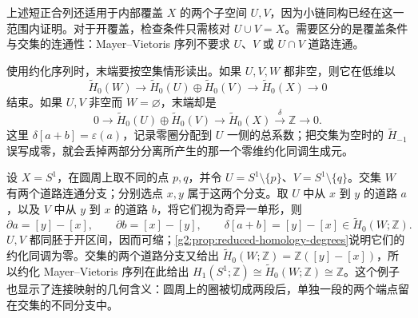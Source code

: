 上述短正合列还适用于内部覆盖 \(X\) 的两个子空间 \(U,V\)，因为小链同构已经在这一范围内证明。对于开覆盖，检查条件只需核对 \(U\cup V=X\)。需要区分的是覆盖条件与交集的连通性：Mayer--Vietoris 序列不要求 \(U\)、\(V\) 或 \(U\cap V\) 道路连通。

\ProseParagraphBreak

使用约化序列时，末端要按空集情形读出。如果 \(U,V,W\) 都非空，则它在低维以
\[
	\widetilde H_0(W)\longrightarrow
	\widetilde H_0(U)\oplus\widetilde H_0(V)
	\longrightarrow\widetilde H_0(X)\longrightarrow0
\]
结束。如果 \(U,V\) 非空而 \(W=\varnothing\)，末端却是
\[
	0\longrightarrow
	\widetilde H_0(U)\oplus\widetilde H_0(V)
	\longrightarrow\widetilde H_0(X)
	\xrightarrow{\delta}\mathbb Z\longrightarrow0.
\]
这里 \(\delta[a+b]=\varepsilon(a)\)，记录零圈分配到 \(U\) 一侧的总系数；把交集为空时的 \(\widetilde H_{-1}\) 误写成零，就会丢掉两部分分离所产生的那一个零维约化同调生成元。

\begin{example}\label{g2:exm:circle-mayer-vietoris-connecting}
	设 \(X=S^1\)，在圆周上取不同的点 \(p,q\)，并令 \(U=S^1\setminus\{p\}\)、\(V=S^1\setminus\{q\}\)。交集 \(W\) 有两个道路连通分支；分别选点 \(x,y\) 属于这两个分支。取 \(U\) 中从 \(x\) 到 \(y\) 的道路 \(a\)，以及 \(V\) 中从 \(y\) 到 \(x\) 的道路 \(b\)，将它们视为奇异一单形，则
	\[
		\partial a=[y]-[x],\qquad
		\partial b=[x]-[y],\qquad
		\delta[a+b]=[y]-[x]\in\widetilde H_0(W;\mathbb Z).
	\]
	\(U,V\) 都同胚于开区间，因而可缩；\cref{g2:prop:reduced-homology-degrees}说明它们的约化同调为零。交集的两个道路分支又给出 \(\widetilde H_0(W;\mathbb Z)=\mathbb Z([y]-[x])\)，所以约化 Mayer--Vietoris 序列在此给出 \(H_1(S^1;\mathbb Z)\cong\widetilde H_0(W;\mathbb Z)\cong\mathbb Z\)。这个例子也显示了连接映射的几何含义：圆周上的圈被切成两段后，单独一段的两个端点留在交集的不同分支中。
\end{example}
